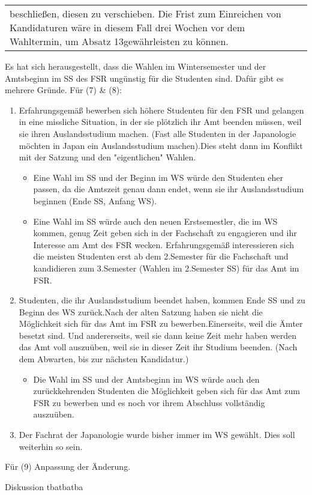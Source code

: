 {\begin{longtable}{|p{7.5cm}|p{7.5cm}|}
        beschließen, diesen zu verschieben. Die Frist zum Einreichen von Kandidaturen wäre in diesem Fall drei Wochen vor dem
        Wahltermin, um Absatz 13gewährleisten zu können.\\
    \end{longtable}
    }{
        Es hat sich herausgestellt, dass die Wahlen im Wintersemester und der Amtsbeginn im SS des FSR ungünstig für die Studenten
        sind. Dafür gibt es mehrere Gründe.\newline
        Für (7) \& (8):
        \begin{enumerate}
            \item Erfahrungsgemäß bewerben sich höhere Studenten für den FSR und gelangen in eine missliche Situation,
            in der sie plötzlich ihr Amt beenden müssen, weil sie ihren Auslandsstudium machen. (Fast alle Studenten in der
            Japanologie möchten in Japan ein Auslandsstudium machen).Dies steht dann im Konflikt mit der Satzung und den 
            "eigentlichen" Wahlen.
            \begin{itemize}
                \item Eine Wahl im SS und der Beginn im WS würde den Studenten eher passen, da die Amtszeit genau dann endet, wenn sie ihr Auslandsstudium beginnen (Ende SS, Anfang WS).
                \item Eine Wahl im SS würde auch den neuen Erstsemestler, die im WS kommen, genug Zeit geben sich in der Fachschaft zu engagieren und ihr Interesse am Amt des FSR wecken. Erfahrungsgemäß interessieren sich die meisten Studenten erst ab dem 2.Semester für die Fachschaft und kandidieren zum 3.Semester (Wahlen im 2.Semester SS) für das Amt im FSR.
            \end{itemize}
            \item Studenten, die ihr Auslandsstudium beendet haben, kommen Ende SS und zu Beginn des WS zurück.Nach der alten Satzung haben sie nicht die Möglichkeit sich für das Amt im FSR zu bewerben.Einerseits, weil die Ämter besetzt sind. Und andererseits, weil sie dann keine Zeit mehr haben werden das Amt voll auszuüben, weil sie in dieser Zeit ihr Studium beenden. (Nach dem Abwarten, bis zur nächsten Kandidatur.)
            \begin{itemize}
                \item Die Wahl im SS und der Amtsbeginn im WS würde auch den zurückkehrenden Studenten die Möglichkeit geben sich für das Amt zum FSR zu bewerben und es noch vor ihrem Abschluss vollständig auszuüben.
            \end{itemize}
            \item Der Fachrat der Japanologie wurde bisher immer im WS gewählt. Dies soll weiterhin so sein.
        \end{enumerate}
        Für (9) Anpassung der Änderung.
    }{
        Diskussion
    }{tba}{tba}{tba}
